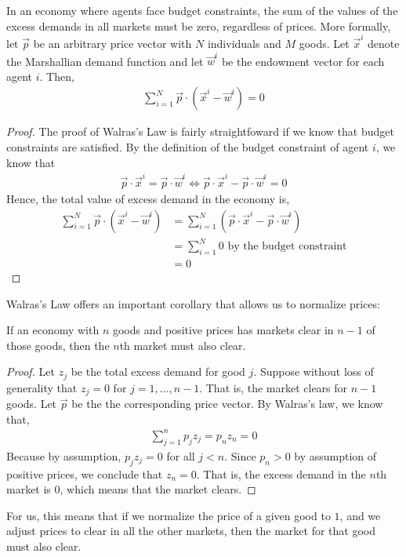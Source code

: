 \begin{theorem*}
    In an economy where agents face budget constraints, the sum of the values of the excess demands in all markets must be zero, regardless of prices. More formally, let $\vec{p}$ be an arbitrary price vector with $N$ individuals and $M$ goods. Let $\vec{x}^i$ denote the Marshallian demand function and let $\vec{w}^i$ be the endowment vector for each agent $i$. Then,
    \begin{align*}
        \sum_{i = 1}^N \vec{p} \cdot (\vec{x}^i - \vec{w}^i) = 0
    \end{align*}
\end{theorem*}
\begin{proof}
    The proof of Walras's Law is fairly straightfoward if we know that budget constraints are satisfied. By the definition of the budget constraint of agent $i$, we know that
    \begin{align*}
        \vec{p} \cdot \vec{x}^i = \vec{p} \cdot \vec{w}^i \iff  \vec{p} \cdot \vec{x}^i - \vec{p} \cdot \vec{w}^i = 0 
    \end{align*}
    Hence, the total value of excess demand in the economy is,
    \begin{align*}
        \sum_{i = 1}^N \vec{p} \cdot (\vec{x}^i - \vec{w}^i) &= \sum_{i = 1}^N  (\vec{p} \cdot \vec{x}^i - \vec{p} \cdot \vec{w}^i) \\
        &= \sum_{i = 1}^N 0 \text{ by the budget constraint}\\
        &= 0 
    \end{align*}
\end{proof}

Walras's Law offers an important corollary that allows us to normalize prices:
\begin{corollary*}
    If an economy with $n$ goods and positive prices has markets clear in $n - 1$ of those goods, then the $n$th market must also clear.
\end{corollary*}

\begin{proof}
    Let $z_j$ be the total excess demand for good $j$. Suppose without loss of generality that $z_j = 0$ for $j = 1, \dots, n - 1$. That is, the market clears for $n - 1$ goods. Let $\vec{p}$ be the the corresponding price vector. By Walras's law, we know that, 
    \begin{align*}
        \sum_{j = 1}^n p_j z_j = p_n z_n = 0
    \end{align*}
    Because by assumption, $p_j z_j = 0$ for all $j < n$. Since $p_n > 0$ by assumption of positive prices, we conclude that $z_n = 0$. That is, the excess demand in the $n$th market is 0, which means that the market clears. 
\end{proof}
For us, this means that if we normalize the price of a given good to $1$, and we adjust prices to clear in all the other markets, then the market for that good must also clear. 

